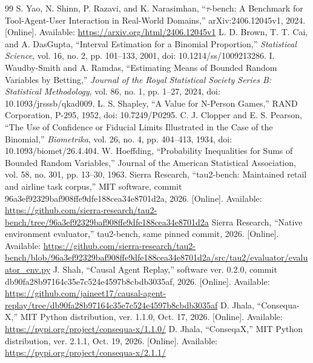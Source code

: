 \documentclass[conference]{IEEEtran}
\begin{document}
\begin{thebibliography}{99}
S. Yao, N. Shinn, P. Razavi, and K. Narasimhan, ``$\tau$-bench: A Benchmark for Tool-Agent-User Interaction in Real-World Domains,'' arXiv:2406.12045v1, 2024. [Online]. Available: \url{https://arxiv.org/html/2406.12045v1}
L. D. Brown, T. T. Cai, and A. DasGupta, ``Interval Estimation for a Binomial Proportion,'' \emph{Statistical Science}, vol. 16, no. 2, pp. 101--133, 2001, doi: 10.1214/ss/1009213286.
I. Waudby-Smith and A. Ramdas, ``Estimating Means of Bounded Random Variables by Betting,'' \emph{Journal of the Royal Statistical Society Series B: Statistical Methodology}, vol. 86, no. 1, pp. 1--27, 2024, doi: 10.1093/jrsssb/qkad009.
 L. S. Shapley, ``A Value for N-Person Games,'' RAND
Corporation, P-295, 1952, doi: 10.7249/P0295.
C. J. Clopper and E. S. Pearson, ``The Use of Confidence or Fiducial Limits Illustrated in the Case of the Binomial,'' \emph{Biometrika}, vol. 26, no. 4, pp. 404--413, 1934, doi: 10.1093/biomet/26.4.404.
 W. Hoeffding, ``Probability Inequalities for Sums of
Bounded Random Variables,'' Journal of the American Statistical Association,
vol. 58, no. 301, pp. 13--30, 1963.
Sierra Research, ``tau2-bench: Maintained retail and airline task corpus,''
MIT software, commit 96a3ef92329baf908ffe9dfe188cea34e8701d2a, 2026.
[Online]. Available:
\url{https://github.com/sierra-research/tau2-bench/tree/96a3ef92329baf908ffe9dfe188cea34e8701d2a}
Sierra Research, ``Native environment evaluator,'' tau2-bench, same pinned
commit, 2026. [Online]. Available:
\url{https://github.com/sierra-research/tau2-bench/blob/96a3ef92329baf908ffe9dfe188cea34e8701d2a/src/tau2/evaluator/evaluator_env.py}
J. Shah, ``Causal Agent Replay,'' software ver. 0.2.0, commit
db90fa28b97164c35e7c524e4597b8cbdb3035af, 2026. [Online]. Available:
\url{https://github.com/jaineet17/causal-agent-replay/tree/db90fa28b97164c35e7c524e4597b8cbdb3035af}
 D. Jhala, ``Consequa-X,'' MIT Python distribution,
ver. 1.1.0, Oct. 17, 2026. [Online]. Available:
\url{https://pypi.org/project/consequa-x/1.1.0/}
 D. Jhala, ``ConseqaX,'' MIT Python distribution,
ver. 2.1.1, Oct. 19, 2026. [Online]. Available:
\url{https://pypi.org/project/consequa-x/2.1.1/}
\end{thebibliography}
\end{document}
